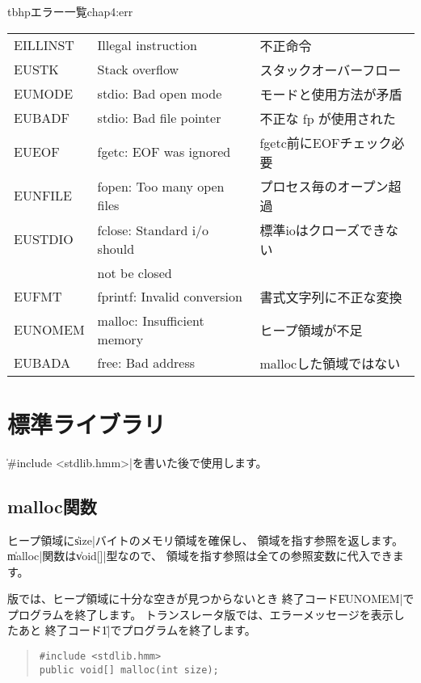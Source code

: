 \begin{mytable}{tbhp}{エラー一覧}{chap4:err}
\begin{tabular}{l|l|l}
EILLINST  & Illegal instruction         & 不正命令 \\
EUSTK     & Stack overflow              & スタックオーバーフロー \\
EUMODE    & stdio: Bad open mode        & モードと使用方法が矛盾 \\
EUBADF    & stdio: Bad file pointer     & 不正な fp が使用された \\
EUEOF     & fgetc: EOF was ignored      & fgetc前にEOFチェック必要 \\
EUNFILE   & fopen: Too many open files  & プロセス毎のオープン超過 \\
EUSTDIO   & fclose: Standard i/o should & 標準ioはクローズできない \\
          &  not be closed              &                          \\
EUFMT     & fprintf: Invalid conversion & 書式文字列に不正な変換 \\
EUNOMEM   & malloc: Insufficient memory & ヒープ領域が不足 \\
EUBADA    & free: Bad address           & mallocした領域ではない \\
\end{tabular}
\end{mytable}

\section{標準ライブラリ}

\|#include <stdlib.hmm>|を書いた後で使用します。

\subsection{malloc関数}

ヒープ領域に\|size|バイトのメモリ領域を確保し、
領域を指す参照を返します。
\|malloc|関数は\|void[]|型なので、
領域を指す参照は全ての参照変数に代入できます。

\tac 版では、ヒープ領域に十分な空きが見つからないとき
終了コード\|EUNOMEM|でプログラムを終了します。
トランスレータ版では、エラーメッセージを表示したあと
終了コード\|1|でプログラムを終了します。

\begin{quote}
\begin{verbatim}
#include <stdlib.hmm>
public void[] malloc(int size);
\end{verbatim}
\end{quote}

